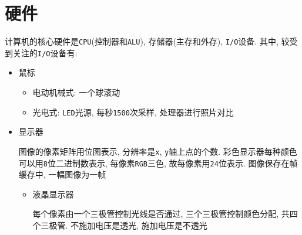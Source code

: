 \section{硬件}
计算机的核心硬件是\verb|CPU|(控制器和\verb|ALU|), 存储器(主存和外存), \verb|I/O|设备. 其中, 较受到关注的\verb|I/O|设备有:
\begin{itemize}
\item 鼠标
\begin{itemize}
\item 电动机械式: 一个球滚动
\item 光电式: \verb|LED|光源, 每秒\verb|1500|次采样, 处理器进行照片对比
\end{itemize}
\item 显示器 \par 图像的像素矩阵用位图表示, 分辨率是\verb|x|, \verb|y|轴上点的个数. 彩色显示器每种颜色可以用\verb|8|位二进制数表示, 每像素\verb|RGB|三色, 故每像素用\verb|24|位表示. 图像保存在帧缓存中, 一幅图像为一帧
\begin{itemize}
\item 液晶显示器 \par 每个像素由一个三极管控制光线是否通过, 三个三极管控制颜色分配, 共四个三极管. 不施加电压是透光, 施加电压是不透光
\end{itemize}
\end{itemize}
